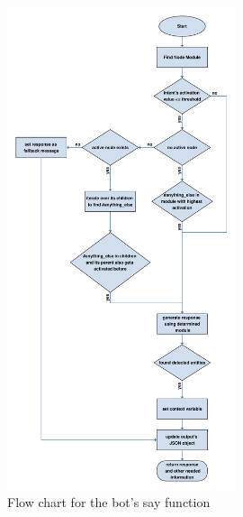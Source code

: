 \begin{figure}[!h]
    \centering
    \includegraphics[width=0.6\textwidth]{img/bot.pdf}
    \caption{Flow chart for the bot's say function}
    \label{fig:flowBot}
\end{figure}

